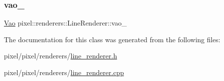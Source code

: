 \mbox{\label{classpixel_1_1renderers_1_1_line_renderer_aaa62d25c3b7c62156a4c90053f6a659e}} 
\subsubsection{\texorpdfstring{vao\+\_\+}{vao\_}}
{\footnotesize\ttfamily \hyperlink{classpixel_1_1graphics_1_1_vao}{Vao} pixel\+::renderers\+::\+Line\+Renderer\+::vao\+\_\+\hspace{0.3cm}{\ttfamily [private]}}



The documentation for this class was generated from the following files\+:\begin{DoxyCompactItemize}
\item 
pixel/pixel/renderers/\hyperlink{line__renderer_8h}{line\+\_\+renderer.\+h}\item 
pixel/pixel/renderers/\hyperlink{line__renderer_8cpp}{line\+\_\+renderer.\+cpp}\end{DoxyCompactItemize}
